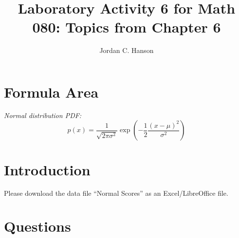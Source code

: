 \documentclass{article}
\begin{document}
\title{Laboratory Activity 6 for Math 080: Topics from Chapter 6}
\author{Jordan C. Hanson}
\maketitle

\section{Formula Area}

\textit{Normal distribution PDF:}
\begin{equation}
p(x) = \frac{1}{\sqrt{2\pi\sigma^2}}\exp\left( -\frac{1}{2} \frac{(x-\mu)^2}{\sigma^2} \right) \label{eq:1}
\end{equation}

\section{Introduction}

Please download the data file ``Normal Scores'' as an Excel/LibreOffice file.

\section{Questions}
\end{document}

